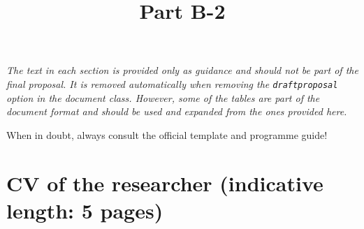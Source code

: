 \documentclass[12pt,draftproposal]{msca-pf}
\title{Part B-2}
\author{}
\date{}
\begin{document}
\maketitle

\begin{mscaexplanation}
\itshape The text in each section is provided only as guidance and should not be part of
the final proposal. It is removed automatically when removing the \texttt{draftproposal}
option in the document class. However, some of the tables are part of the document
format and should be used and expanded from the ones provided here.

When in doubt, always consult the official template and programme guide!
\end{mscaexplanation}

\section{CV of the researcher (indicative length: 5 pages)}
\label{sc:cv}
\end{document}
